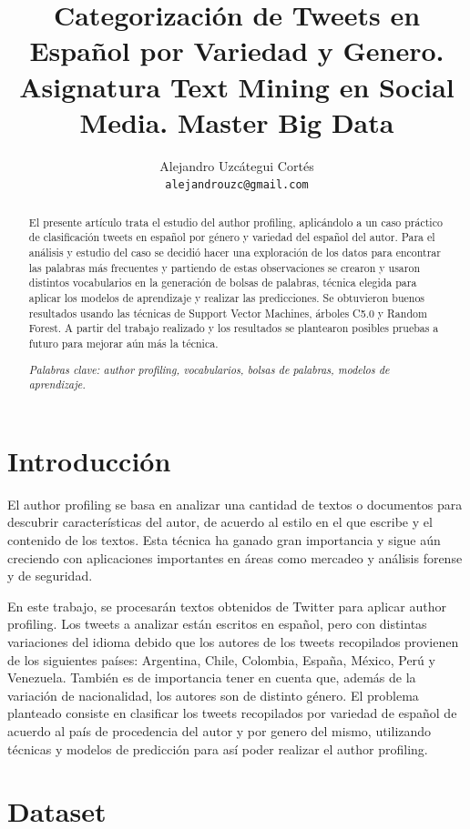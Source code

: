 \documentclass[11pt,a4paper]{article}
\title{Categorizaci\'on de Tweets en Español por Variedad y Genero. Asignatura Text Mining en Social Media. Master Big Data}
\author{Alejandro Uzc\'ategui Cort\'es \\
  {\tt alejandrouzc@gmail.com} \\}
\date{}
\begin{document}
\maketitle
\begin{abstract}
El presente artículo trata el estudio del author profiling, aplicándolo a un caso práctico de clasificación tweets en español por género y variedad del español del autor. Para el análisis y estudio del caso se decidió hacer una exploración de los datos para encontrar las palabras más frecuentes y partiendo de estas observaciones se crearon y usaron distintos vocabularios en la generación de bolsas de palabras, técnica elegida para aplicar los modelos de aprendizaje y realizar las predicciones. Se obtuvieron buenos resultados usando las técnicas de Support Vector Machines, árboles C5.0 y Random Forest. A partir del trabajo realizado y los resultados se plantearon posibles pruebas a futuro para mejorar aún más la técnica.

\textit{Palabras clave: author profiling, vocabularios, bolsas de palabras, modelos de aprendizaje.}
\end{abstract}


\section{Introducción}
  El author profiling se basa en analizar una cantidad de textos o documentos para descubrir características del autor, de acuerdo al estilo en el que escribe y el contenido de los textos. Esta técnica ha ganado gran importancia y sigue aún creciendo con aplicaciones importantes en áreas como mercadeo y análisis forense y de seguridad.

En este trabajo, se procesarán textos obtenidos de Twitter para aplicar author profiling. Los tweets a analizar están escritos en español, pero con distintas variaciones del idioma debido que los autores de los tweets recopilados provienen de los siguientes países: Argentina, Chile, Colombia, España, México, Perú y Venezuela. También es de importancia tener en cuenta que, además de la variación de nacionalidad, los autores son de distinto género. El problema planteado consiste en clasificar los tweets recopilados por variedad de español de acuerdo al país de procedencia del autor y por genero del mismo, utilizando técnicas y modelos de predicción para así poder realizar el author profiling.

\section{Dataset}
\end{document}
